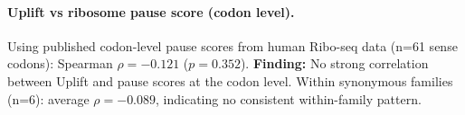 \paragraph{Uplift vs ribosome pause score (codon level).}
Using published codon-level pause scores from human Ribo-seq data (n=61 sense codons):
Spearman $\rho=-0.121$ ($p=0.352$).
\textbf{Finding:} No strong correlation between Uplift and pause scores at the codon level.
Within synonymous families (n=6): average $\rho=-0.089$, indicating no consistent within-family pattern.
